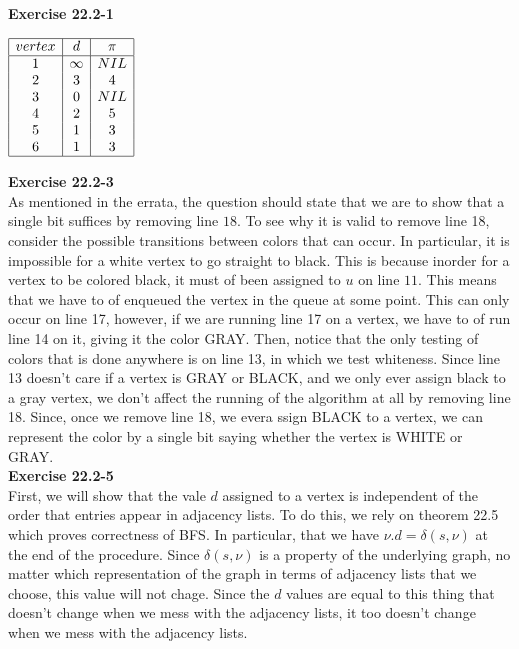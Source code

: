 \documentclass{article}
\begin{document}
\noindent\textbf{Exercise 22.2-1}\\
\begin{center}
$\begin{array}{|c|c|c|}
\hline
vertex& d&\pi\\
\hline
1&\infty&NIL\\
2&3&4\\
3&0&NIL\\
4&2&5\\
5&1&3\\
6&1&3\\
\hline
\end{array}
$
\end{center}
\noindent\textbf{Exercise 22.2-3}\\
As mentioned in the errata, the question should state that we are to show that a single bit suffices by removing line $18$. To see why it is valid to remove line 18, consider the possible transitions between colors that can occur. In particular, it is impossible for a white vertex to go straight to black. This is because inorder for a vertex to be colored black, it must of been assigned to $u$ on line $11$. This means that we have to of enqueued the vertex in the queue at some point. This can only occur on line 17, however, if we are running line 17 on a vertex, we have to of run line 14 on it, giving it the color GRAY. Then, notice that the only testing of colors that is done anywhere is on line 13, in which we test whiteness. Since line 13 doesn't care if a vertex is GRAY or BLACK, and we only ever assign black to a gray vertex, we don't affect the running of the algorithm at all by removing line 18. Since, once we remove line 18, we evera ssign BLACK to a vertex, we can represent the color by a single bit saying whether the vertex is WHITE or GRAY.\\


\noindent\textbf{Exercise 22.2-5}\\
First, we will show that the vale $d$ assigned to a vertex is independent of the order that entries appear in adjacency lists. To do this, we rely on theorem 22.5 which proves correctness of BFS. In particular, that we have $\nu.d = \delta(s,\nu)$ at the end of the procedure. Since $\delta(s,\nu)$ is a property of the underlying graph, no matter which representation of the graph in terms of adjacency lists that we choose, this value will not chage. Since the $d$ values are equal to this thing that doesn't change when we mess with the adjacency lists, it too doesn't change when we mess with the adjacency lists.
\end{document}

